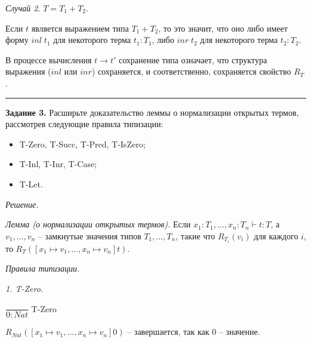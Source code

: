 \documentclass[landscape, 11pt]{report}
\begin{document}
	\textit{Случай 2.} $T = T_1 + T_2$.

	\vspace{0.2cm}
	
	Если $t$ является выражением типа $T_1 + T_2$, то это значит, что оно либо имеет форму $inl \; t_1$ для некоторого терма $t_1 : T_1$, либо $inr \; t_2$ для некоторого терма $t_2 : T_2$.
	
	\vspace{0.2cm}
	
	В процессе вычисления $t \rightarrow t'$ сохранение типа означает, что структура выражения ($inl$ или $inr$) сохраняется, и соответственно, сохраняется свойство $R_T$.
	
	
	\vspace{0.5cm}
	\hrule
	\vspace{0.5cm}
	
	\textbf{Задание 3.} Расширьте доказательство леммы о нормализации открытых термов, рассмотрев следующие правила типизации:
	
	\begin{itemize}
		\item T-Zero, T-Succ, T-Pred, T-IsZero;
		\item T-Inl, T-Inr, T-Case;
		\item T-Let.
	\end{itemize}

	\vspace{0.2cm}
	
	\textit{Решение.}
	
	\vspace{0.2cm}
	
	\textit{Лемма (о нормализации открытых термов).} Если $x_1 : T_1, ..., x_n : T_n \vdash t : T$, а $v_1, ..., v_n$ -- замкнутые значения типов $T_1, ..., T_n$, такие что $R_{T_i}(v_i)$ для каждого $i$, то $R_T([x_1 \mapsto v_1, ..., x_n \mapsto v_n]t)$.
	
	\newpage
	
	\textit{Правила типизации.}
	
	\vspace{0.2cm}
	
	\textit{1. T-Zero.}
	
	\vspace{0.2cm}
	
	$\dfrac{}{0 : Nat}$ T-Zero
	
	\vspace{0.2cm}
	
	$R_{Nat}([x_1 \mapsto v_1, ..., x_n \mapsto v_n]0)$ -- завершается, так как 0 -- значение.
\end{document}
